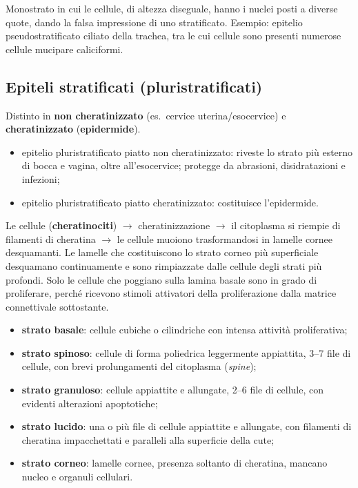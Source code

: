 Monostrato in cui le cellule, di altezza diseguale, hanno i nuclei posti a diverse quote, dando la falsa impressione di uno stratificato. Esempio: epitelio pseudostratificato ciliato della trachea, tra le cui cellule sono presenti numerose cellule mucipare caliciformi.

\subsection{Epiteli stratificati (pluristratificati)}

Distinto in \textbf{non cheratinizzato} (es.\ cervice uterina/esocervice) e \textbf{cheratinizzato} (\textbf{epidermide}).
\begin{itemize}
  \item epitelio pluristratificato piatto non cheratinizzato: riveste lo strato più esterno di bocca e vagina, oltre all'esocervice; protegge da abrasioni, disidratazioni e infezioni;
  \item epitelio pluristratificato piatto cheratinizzato: costituisce l'epidermide.
\end{itemize}

Le cellule (\textbf{cheratinociti}) $\rightarrow$ cheratinizzazione $\rightarrow$ il citoplasma si riempie di filamenti di cheratina $\rightarrow$ le cellule muoiono trasformandosi in lamelle cornee desquamanti. Le lamelle che costituiscono lo strato corneo più superficiale desquamano continuamente e sono rimpiazzate dalle cellule degli strati più profondi. Solo le cellule che poggiano sulla lamina basale sono in grado di proliferare, perché ricevono stimoli attivatori della proliferazione dalla matrice connettivale sottostante.

\begin{itemize}
  \item \textbf{strato basale}: cellule cubiche o cilindriche con intensa attività proliferativa;
  \item \textbf{strato spinoso}: cellule di forma poliedrica leggermente appiattita, 3--7 file di cellule, con brevi prolungamenti del citoplasma (\textit{spine});
  \item \textbf{strato granuloso}: cellule appiattite e allungate, 2--6 file di cellule, con evidenti alterazioni apoptotiche;
  \item \textbf{strato lucido}: una o più file di cellule appiattite e allungate, con filamenti di cheratina impacchettati e paralleli alla superficie della cute;
  \item \textbf{strato corneo}: lamelle cornee, presenza soltanto di cheratina, mancano nucleo e organuli cellulari.
\end{itemize}

